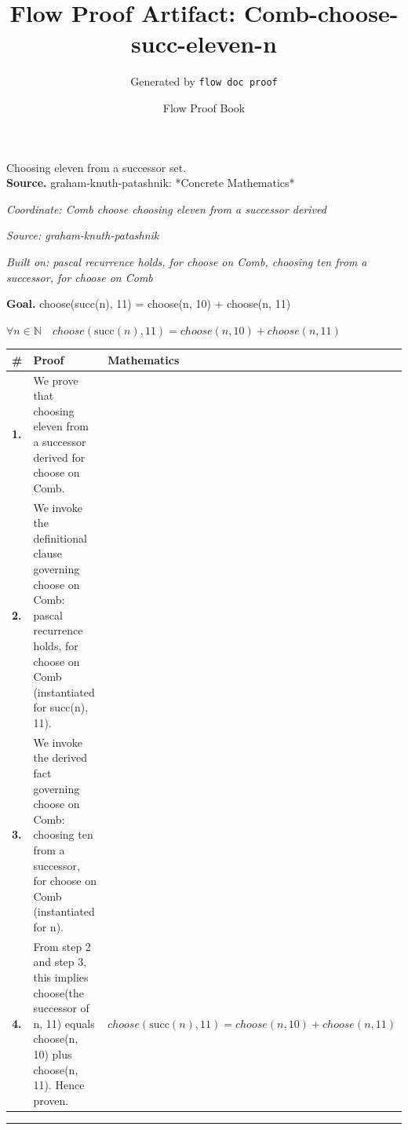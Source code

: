 \documentclass[11pt]{article}
\title{Flow Proof Artifact: Comb-choose-succ-eleven-n}
\author{Generated by \texttt{flow doc proof}}
\date{Flow Proof Book}
\theoremstyle{definition}
\begin{document}
\maketitle
Choosing eleven from a successor set.\\[0.5em]
\textbf{Source.} graham-knuth-patashnik: *Concrete Mathematics*\\[0.5em]
\bigskip
{}\par
\smallskip\noindent\textit{Coordinate: Comb \cdot choose \cdot choosing eleven from a successor derived}\par
\smallskip\noindent\textit{Source: graham-knuth-patashnik}\par
\smallskip\noindent\textit{Built on: pascal recurrence holds, for choose on Comb, choosing ten from a successor, for choose on Comb}\par
\medskip
\noindent\textbf{Goal.} choose(succ(n), 11) = choose(n, 10) + choose(n, 11)\par
\noindent$\displaystyle \forall n \in \mathbb{N}\quad choose(\mathrm{succ}(n), 11) = choose(n, 10) + choose(n, 11)$\par
\medskip
\noindent
\begin{tabular}{@{} >{\raggedright\arraybackslash}p{} >{\raggedright\arraybackslash}p{} >{\raggedleft\arraybackslash}p{} @{}}
\textbf{\#} & \textbf{Proof} & \textbf{Mathematics} \\
\midrule
\textbf{1.} & We prove that choosing eleven from a successor derived for choose on Comb. & \\[0.45em]
\textbf{2.} & We invoke the definitional clause governing choose on Comb: pascal recurrence holds, for choose on Comb (instantiated for succ(n), 11). & \\[0.45em]
\textbf{3.} & We invoke the derived fact governing choose on Comb: choosing ten from a successor, for choose on Comb (instantiated for n). & \\[0.45em]
\textbf{4.} & From step 2 and step 3, this implies choose(the successor of n, 11) equals choose(n, 10) plus choose(n, 11). Hence proven. & $\displaystyle choose(\mathrm{succ}(n), 11) = choose(n, 10) + choose(n, 11)$ \\[0.45em]
\bottomrule
\end{tabular}
\label{thm:Comb-choose-choosing_eleven_from_a_successor_derived}
\par\medskip\hrule
\end{document}
